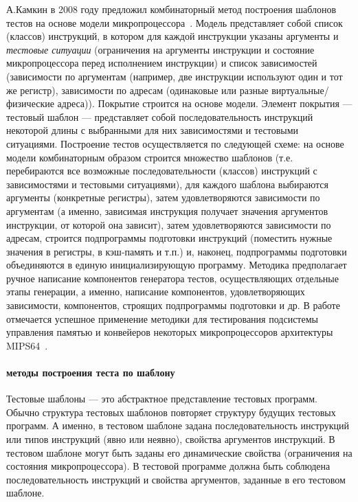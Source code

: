 \documentclass[14pt]{extreport}
\begin{document}
А.Камкин в 2008 году предложил комбинаторный метод построения шаблонов тестов на основе модели микропроцессора~\cite{MicroTESK}. Модель представляет собой список (классов) инструкций, в котором для каждой инструкции указаны аргументы и \emph{тестовые ситуации} (ограничения на аргументы инструкции и состояние микропроцессора перед исполнением инструкции) и список зависимостей (зависимости по аргументам (например, две инструкции используют один и тот же регистр), зависимости по адресам (одинаковые или разные виртуальные/физические адреса)). Покрытие строится на основе модели. Элемент покрытия --- тестовый шаблон --- представляет собой последовательность инструкций некоторой длины с выбранными для них зависимостями и тестовыми ситуациями. Построение тестов осуществляется по следующей схеме: на основе модели комбинаторным образом строится множество шаблонов (т.е. перебираются все возможные последовательности (классов) инструкций с зависимостями и тестовыми ситуациями), для каждого шаблона выбираются аргументы (конкретные регистры), затем удовлетворяются зависимости по аргументам (а именно, зависимая инструкция получает значения аргументов инструкции, от которой она зависит), затем удовлетворяются зависимости по адресам, строится подпрограммы подготовки инструкций (поместить нужные значения в регистры, в кэш-память и т.п.) и, наконец, подпрограммы подготовки объединяются в единую инициализирующую программу. Методика предполагает ручное написание компонентов генератора тестов, осуществляющих отдельные этапы генерации, а именно, написание компонентов, удовлетворяющих зависимости, компонентов, строящих подпрограммы подготовки и др. В работе отмечается успешное применение методики для тестирования подсистемы управления памятью и конвейеров некоторых микропроцессоров архитектуры MIPS64~\cite{mips64_II}.

\paragraph{методы построения теста по шаблону}

Тестовые шаблоны --- это абстрактное представление тестовых программ. Обычно структура тестовых шаблонов повторяет структуру будущих тестовых программ. А именно, в тестовом шаблоне задана последовательность инструкций или типов инструкций (явно или неявно), свойства аргументов инструкций. В тестовом шаблоне могут быть заданы его динамические свойства (ограничения на состояния микропроцессора). В тестовой программе должна быть соблюдена последовательность инструкций и свойства аргументов, заданные в его тестовом шаблоне.
\end{document}
